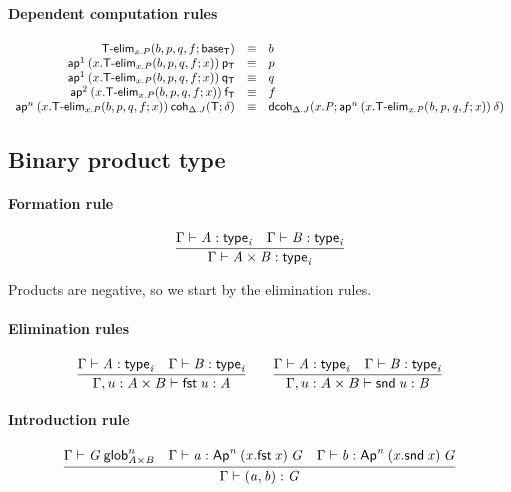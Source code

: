 
\paragraph{Dependent computation rules}

\[
\begin{array}{rcl}
\mathsf{T\text{-}elim}_{x.P}(b, p, q, f; \mathsf{base_T}) & \equiv & b \\
\mathsf{ap}^{1} \: {(x.\mathsf{T\text{-}elim}_{x.P}(b, p, q, f; x))} \: {\mathsf{p_T}} & \equiv & p\\
\mathsf{ap}^{1} \: {(x.\mathsf{T\text{-}elim}_{x.P}(b, p, q, f; x))} \: {\mathsf{q_T}} & \equiv & q\\
\mathsf{ap}^{2} \: {(x.\mathsf{T\text{-}elim}_{x.P}(b, p, q, f; x))} \: {\mathsf{f_T}} & \equiv & f\\
\mathsf{ap}^{n} \: {(x.\mathsf{T\text{-}elim}_{x.P}(b, p, q, f; x))} \: {\mathsf{coh}_{\Delta.J} \mathit{(\mathsf{T};\delta)}} & \equiv &
\mathsf{dcoh}_{\Delta.J} \mathit{(x.P;\mathsf{ap}^{n} \: {(x.\mathsf{T\text{-}elim}_{x.P}(b, p, q, f; x))} \: {\delta})}
\end{array}
\]

\subsection{Binary product type}

\paragraph{Formation rule}

\[
\infer{\ofglob\Gamma{A\times B}{\typ i}}
{\ofglob\Gamma{A}{\typ i} &
  \ofglob\Gamma{B}{\typ i}}
\]

Products are negative, so we start by the elimination rules.

\paragraph{Elimination rules}
\[
\infer{\ofglob{\Gamma,u:A\times B}{\fst u}{A}}
{\ofglob\Gamma{A}{\typ i} &
  \ofglob\Gamma{B}{\typ i}}
\qquad
\infer{\ofglob{\Gamma,u:A\times B}{\snd u}{B}}
{\ofglob\Gamma{A}{\typ i} &
  \ofglob\Gamma{B}{\typ i}}
\]

\paragraph{Introduction rule}
\[
\infer{\ofglob{\Gamma}{(a, b)}{G}}
{\wfglob{\Gamma}{G}{n}{A\times B}
  & \ofglob\Gamma{a}{\Apn{n}{(x.\fst x)}{G}}
  & \ofglob\Gamma{b}{\Apn{n}{(x.\snd x)}{G}}
}
\]

